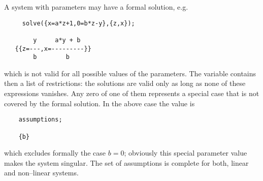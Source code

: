 A system  with parameters may have a formal solution, e.g.\
\begin{verbatim}
     solve({x=a*z+1,0=b*z-y},{z,x});

        y     a*y + b
   {{z=---,x=---------}}
        b        b
\end{verbatim}
which is not valid for all possible values of the parameters.
\hypertarget{reserved:assumptions}{}
The variable 
contains then a list of
restrictions: the solutions are valid only as long
as none of these expressions vanishes. Any zero of one of them
represents a special case that is not covered by the
formal solution. In the above case the value is
\begin{verbatim}
    assumptions;

    {b}
\end{verbatim}
which excludes formally the case $b=0$; obviously this special
parameter value makes the system singular. The set of assumptions
is complete for both, linear and non--linear systems.

